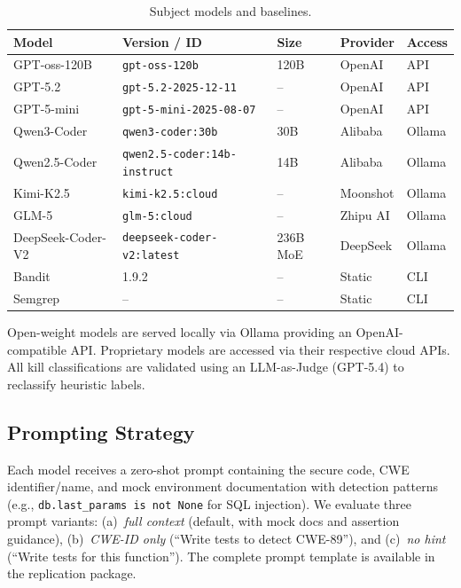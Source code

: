 \documentclass[sigconf,anonymous,review]{acmart}
\begin{document}
\begin{table}[t]
\caption{Subject models and baselines.}
\label{tab:models}
\small

\begin{tabular}{lllll}
\toprule
\textbf{Model} & \textbf{Version / ID} & \textbf{Size} & \textbf{Provider} & \textbf{Access} \\
\midrule
GPT-oss-120B & \texttt{gpt-oss-120b} & 120B & OpenAI & API \\
GPT-5.2 & \texttt{gpt-5.2-2025-12-11} & -- & OpenAI & API \\
GPT-5-mini & \texttt{gpt-5-mini-2025-08-07} & -- & OpenAI & API \\
Qwen3-Coder & \texttt{qwen3-coder:30b} & 30B & Alibaba & Ollama \\
Qwen2.5-Coder & \texttt{qwen2.5-coder:14b-instruct} & 14B & Alibaba & Ollama \\
Kimi-K2.5 & \texttt{kimi-k2.5:cloud} & -- & Moonshot & Ollama \\
GLM-5 & \texttt{glm-5:cloud} & -- & Zhipu AI & Ollama \\
DeepSeek-Coder-V2 & \texttt{deepseek-coder-v2:latest} & 236B MoE & DeepSeek & Ollama \\
\midrule
Bandit & 1.9.2 & -- & Static & CLI \\
Semgrep & -- & -- & Static & CLI \\
\bottomrule
\end{tabular}

\end{table}

Open-weight models are served locally via Ollama providing an OpenAI-compatible API. Proprietary models are accessed via their respective cloud APIs. All kill classifications are validated using an LLM-as-Judge (GPT-5.4) to reclassify heuristic labels.


\subsection{Prompting Strategy}

Each model receives a zero-shot prompt containing the secure code, CWE identifier/name, and mock environment documentation with detection patterns (e.g., \texttt{db.last\_params is not None} for SQL injection). We evaluate three prompt variants: (a)~\emph{full context} (default, with mock docs and assertion guidance), (b)~\emph{CWE-ID only} (``Write tests to detect CWE-89''), and (c)~\emph{no hint} (``Write tests for this function''). The complete prompt template is available in the replication package.
\end{document}
